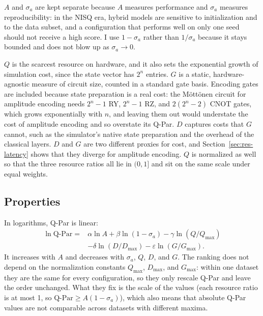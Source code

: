 \documentclass{ieeeaccess}
\newcommand{\QP}{\text{Q-Par}}                %
\begin{document}
$A$ and $\sigma_a$ are kept separate because $A$ measures performance and $\sigma_a$ measures reproducibility: in the NISQ era, hybrid models are sensitive to initialization and to the data subset, and a configuration that performs well on only one seed should not receive a high score. I use $1-\sigma_a$ rather than $1/\sigma_a$ because it stays bounded and does not blow up as $\sigma_a \to 0$.

$Q$ is the scarcest resource on hardware, and it also sets the exponential growth of simulation cost, since the state vector has $2^n$ entries. $G$ is a static, hardware-agnostic measure of circuit size, counted in a standard gate basis. Encoding gates are included because state preparation is a real cost: the M\"ott\"onen circuit for amplitude encoding needs $2^n-1$ RY, $2^n-1$ RZ, and $2(2^n-2)$ CNOT gates, which grows exponentially with $n$, and leaving them out would understate the cost of amplitude encoding and so overstate its Q-Par. $D$ captures costs that $G$ cannot, such as the simulator's native state preparation and the overhead of the classical layers. $D$ and $G$ are two different proxies for cost, and Section~\ref{sec:res-latency} shows that they diverge for amplitude encoding. $Q$ is normalized as well so that the three resource ratios all lie in $(0, 1]$ and sit on the same scale under equal weights.

\subsection{Properties}
\label{sec:qpar-props}

In logarithms, Q-Par is linear:
\begin{equation}
\begin{split}
\ln \QP ={}& \alpha\ln A + \beta\ln(1-\sigma_a) - \gamma\ln(Q/Q_{\max})\\
&- \delta\ln(D/D_{\max}) - \varepsilon\ln(G/G_{\max}).
\end{split}
\label{eq:logqpar}
\end{equation}
It increases with $A$ and decreases with $\sigma_a$, $Q$, $D$, and $G$. The ranking does not depend on the normalization constants $Q_{\max}$, $D_{\max}$, and $G_{\max}$: within one dataset they are the same for every configuration, so they only rescale Q-Par and leave the order unchanged. What they fix is the scale of the values (each resource ratio is at most 1, so $\QP \geq A(1-\sigma_a)$), which also means that absolute Q-Par values are not comparable across datasets with different maxima.
\end{document}
